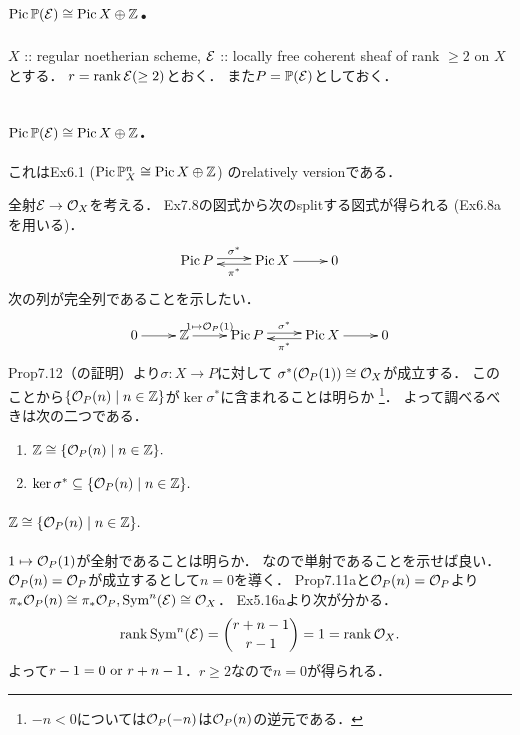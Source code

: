 \documentclass[a4paper]{jsarticle}
\newcommand{\Pic}{\operatorname{Pic}}
\newcommand{\Sym}{\operatorname{Sym}}
\newcommand{\pbundle}{\mathbb{P}}
\begin{document}
\section{$\Pic \pbundle(\shE) \iso \Pic X \oplus \Z$.} %
    $X$ :: regular noetherian scheme,
    $\mathcal{E}$ :: locally free coherent sheaf of rank $\geq 2$ on $X$とする．
    $r=\operatorname{rank} \mathcal{E} (\geq 2)$とおく．
    また$P=\pbundle(\shE)$としておく．

    \subsection{$\Pic \pbundle(\shE) \iso \Pic X \oplus \Z$.}
    これはEx6.1 ($\Pic \proj_X^n \iso \Pic X \oplus \Z$) のrelatively versionである．

    全射$\mathcal{E} \to \mathcal{O}_X$を考える．
    Ex7.8の図式から次のsplitする図式が得られる (Ex6.8aを用いる)．
    \[
        \xymatrix
        {
            \Pic P \ar@<2pt>[r]^-{\sigma^*}&\ar@<2pt>[l]^-{\pi^*} \Pic X \ar[r]& 0
        }
    \]
    次の列が完全列であることを示したい．
    \[
        \xymatrix
        {
            0 \ar[r]& \Z \ar[r]^-{1 \mapsto \shO_P(1)}& \Pic P \ar@<2pt>[r]^-{\sigma^*}&\ar@<2pt>[l]^-{\pi^*} \Pic X \ar[r]& 0
        }
    \]
    Prop7.12（の証明）より$\sigma: X \to P$に対して
    $\sigma^*(\mathcal{O}_P(1)) \cong \mathcal{O}_X$が成立する．
    このことから$\{ \mathcal{O}_P(n) \mid n \in \mathbb{Z} \}$が$\ker \sigma^*$に含まれることは明らか
    \footnote
    {
        $-n<0$については$\mathcal{O}_P(-n)$は$\mathcal{O}_P(n)$の逆元である．
    }．
    よって調べるべきは次の二つである．
    \begin{enumerate}[label=(\roman*)]
        \item $\mathbb{Z} \cong \{ \mathcal{O}_P(n) \mid n \in \mathbb{Z} \}.$
        \item $\ker \sigma^* \subseteq \{ \mathcal{O}_P(n) \mid n \in \mathbb{Z} \}.$
    \end{enumerate}

    \paragraph{$\mathbb{Z} \cong \{ \mathcal{O}_P(n) \mid n \in \mathbb{Z} \}.$}
    $1 \mapsto \mathcal{O}_P(1)$が全射であることは明らか．
    なので単射であることを示せば良い．
    $\mathcal{O}_P(n)=\mathcal{O}_P$が成立するとして$n=0$を導く．
    Prop7.11aと$\mathcal{O}_P(n)=\mathcal{O}_P$より$\pi_*\shO_P(n) \iso \pi_*\shO_P, \Sym^n(\shE) \iso \shO_X$．
    Ex5.16aより次が分かる．
    \[ \rank \Sym^n(\shE)=\binom{r+n-1}{r-1}=1=\rank \shO_X. \]
    よって$r-1=0 \text{ or } r+n-1$．$r \geq 2$なので$n=0$が得られる．
\end{document}
